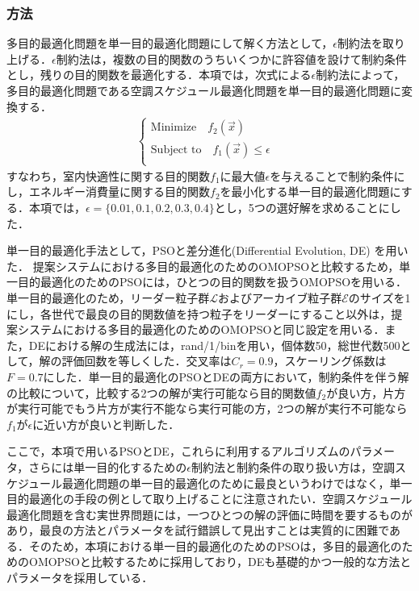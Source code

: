 \subsubsection{方法}
多目的最適化問題を単一目的最適化問題にして解く方法として，$\epsilon$制約法\cite{Haimes71}を取り上げる．$\epsilon$制約法は，複数の目的関数のうちいくつかに許容値を設けて制約条件とし，残りの目的関数を最適化する．本項では，次式による$\epsilon$制約法によって，多目的最適化問題である空調スケジュール最適化問題を単一目的最適化問題に変換する．
\begin{eqnarray}
  \begin{cases}
    \mbox{Minimize} \quad f_2(\vec{x})                  & \\
    \mbox{Subject\ to} \quad f_1(\vec{x}) \leq \epsilon & \\
  \end{cases}
\end{eqnarray}
すなわち，室内快適性に関する目的関数$f_1$に最大値$\epsilon$を与えることで制約条件にし，エネルギー消費量に関する目的関数$f_2$を最小化する単一目的最適化問題にする．本項では，$\epsilon = \{0.01, 0.1, 0.2, 0.3, 0.4\}$とし，5つの選好解を求めることにした．

単一目的最適化手法として，PSOと差分進化(Differential Evolution, DE) \cite{Price06}を用いた．
提案システムにおける多目的最適化のためのOMOPSOと比較するため，単一目的最適化のためのPSOには，ひとつの目的関数を扱うOMOPSOを用いる．単一目的最適化のため，リーダー粒子群$\mathcal{L}$およびアーカイブ粒子群$\mathcal{E}$のサイズを1にし，各世代で最良の目的関数値を持つ粒子をリーダーにすること以外は，提案システムにおける多目的最適化のためのOMOPSOと同じ設定を用いる．また，DEにおける解の生成法には，rand/1/binを用い，個体数50，総世代数500として，解の評価回数を等しくした．交叉率は$C_r=0.9$，スケーリング係数は$F=0.7$にした．単一目的最適化のPSOとDEの両方において，制約条件を伴う解の比較について，比較する2つの解が実行可能なら目的関数値$f_2$が良い方，片方が実行可能でもう片方が実行不能なら実行可能の方，2つの解が実行不可能なら$f_1$が$\epsilon$に近い方が良いと判断した．

ここで，本項で用いるPSOとDE，これらに利用するアルゴリズムのパラメータ，さらには単一目的化するための$\epsilon$制約法と制約条件の取り扱い方は，空調スケジュール最適化問題の単一目的最適化のために最良というわけではなく，単一目的最適化の手段の例として取り上げることに注意されたい．空調スケジュール最適化問題を含む実世界問題には，一つひとつの解の評価に時間を要するものがあり，最良の方法とパラメータを試行錯誤して見出すことは実質的に困難である．そのため，本項における単一目的最適化のためのPSOは，多目的最適化のためのOMOPSOと比較するために採用しており，DEも基礎的かつ一般的な方法とパラメータを採用している．

